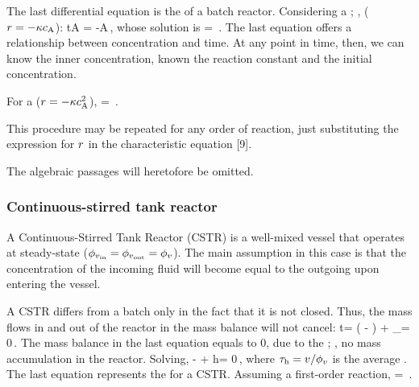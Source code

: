 The last differential equation is the  of a batch reactor. Considering a ; \ie, ($\rrate = -\krcoeff\conc A$):
\beq
\iod t\conc A = -\krcoeff\conc A\,,
\eeq
whose solution is
\beq
{} = \exp{}\,.
\eeq
The last equation offers a relationship between concentration and time. At any point in time, then, we can know the inner concentration, known the reaction constant and the initial concentration.

For a  ($\rrate = -\krcoeff\conc A^2$),
\beq
{} = \,.
\eeq

This procedure may be repeated for any order of reaction, just substituting the expression for $r$ in the
characteristic equation [9]. 

\begin{note}
The algebraic passages will heretofore be omitted.
\end{note}


\subsubsection{Continuous-stirred tank reactor}
A Continuous-Stirred Tank Reactor (CSTR) is a well-mixed vessel that operates at steady-state ($\phi_{v_\text{in}} = \phi_{v_\text{out}} = \phi_{v}$). The main assumption in this case is that the concentration of the incoming fluid will become  equal to the outgoing upon entering the vessel.

A CSTR differs from a batch only in the fact that it is not closed. Thus, the mass flows in and out of the reactor in the mass balance will not cancel:
\beq
\iod t\mass = \flow\vol\left( - \right) + \int_\vol\rrate\dx\vol = 0\,.
\eeq
The mass balance in the last equation equals to 0, due to the ; \ie, no mass accumulation in the reactor. Solving,
\beq
{} -  + \rtime\txt h\rrate = 0\,,
\eeq
where $\tau_\text{h} = v/\phi_{v}$ is the average . The last equation represents the  for a CSTR. Assuming a first-order reaction,
\beq
{} = \,.
\eeq





